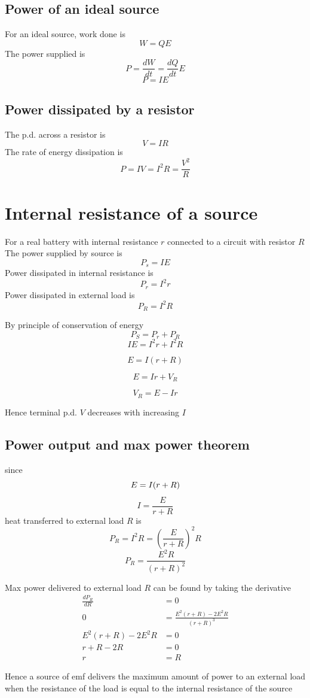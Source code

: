 \documentclass[a4paper, 10pt]{article}
\begin{document}
\subsection{Power of an ideal source}
For an ideal source, work done is
\[
W = QE
\]
The power supplied is
\[
P = \frac{dW}{dt} = \frac{dQ}{dt}E
\]
\[
P = IE
\]

\subsection{Power dissipated by a resistor}
The p.d. across a resistor is
\[
V = IR
\]
The rate of energy dissipation is 
\[
P = IV = I^2R = \frac{V^2}{R}
\]

\section{Internal resistance of a source}
For a real battery with internal resistance $r$ connected to a circuit with resistor $R$  \\

The power supplied by source is 
\[
P_s = IE
\]
Power dissipated in internal resistance is 
\[
P_r = I^2r
\]
Power dissipated in external load is
\[
P_R = I^2R
\]

By principle of conservation of energy
\[
P_S = P_r + P_R
\]
\[
IE = I^2 r + I^2R
\]

\[
   E = I(r + R)
\]

\[
E = Ir + V_R
\]

\[
V_R = E - Ir
\]

Hence terminal p.d. $V$ decreases with increasing $I$ 

\subsection{Power output and max power theorem}
since
\[
   E = I(r + R) \\
\]
\[
I = \frac{E}{r+R}
\]
heat transferred to external load $R$ is
\[
   P_R = I^2 R = \left( \frac{E}{r + R} \right)^2 R 
\]
\[
   P_R = \frac{E^2R}{(r+R)^2}
\]

Max power delivered to external load $R$ can be found by taking the derivative
\begin{align*}
   \frac{dP_R}{dR} &= 0 \\
0 &= \frac{E^2 (r+R) - 2E^2 R}{(r+R)^3} \\
E^2(r+R) - 2E^2R &= 0 \\
r + R - 2R &= 0 \\
r &= R 
\end{align*}	

Hence a source of emf delivers the maximum amount of power to an external load when the resistance of the load is equal to the internal resistance of the source
\end{document}
